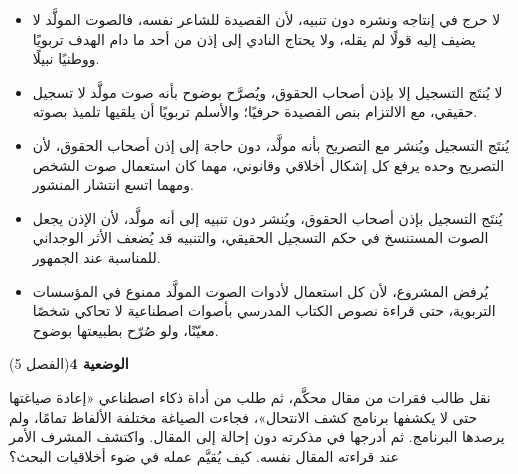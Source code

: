 \documentclass[11pt,a4paper]{article}
\begin{document}
\begin{itemize}[leftmargin=1.0cm, labelsep=6pt, itemsep=3pt, topsep=4pt, parsep=0pt]
  \item[\textbf{أ)}] لا حرج في إنتاجه ونشره دون تنبيه، لأن القصيدة للشاعر نفسه، فالصوت المولَّد لا يضيف إليه قولًا لم يقله، ولا يحتاج النادي إلى إذن من أحد ما دام الهدف تربويًا ووطنيًا نبيلًا.
  \item[\textbf{ب)}] لا يُنتَج التسجيل إلا بإذن أصحاب الحقوق، ويُصرَّح بوضوح بأنه صوت مولَّد لا تسجيل حقيقي، مع الالتزام بنص القصيدة حرفيًا؛ والأسلم تربويًا أن يلقيها تلميذ بصوته.
  \item[\textbf{ج)}] يُنتَج التسجيل ويُنشر مع التصريح بأنه مولَّد، دون حاجة إلى إذن أصحاب الحقوق، لأن التصريح وحده يرفع كل إشكال أخلاقي وقانوني، مهما كان استعمال صوت الشخص ومهما اتسع انتشار المنشور.
  \item[\textbf{د)}] يُنتَج التسجيل بإذن أصحاب الحقوق، ويُنشر دون تنبيه إلى أنه مولَّد، لأن الإذن يجعل الصوت المستنسخ في حكم التسجيل الحقيقي، والتنبيه قد يُضعف الأثر الوجداني للمناسبة عند الجمهور.
  \item[\textbf{هـ)}] يُرفض المشروع، لأن كل استعمال لأدوات الصوت المولَّد ممنوع في المؤسسات التربوية، حتى قراءة نصوص الكتاب المدرسي بأصوات اصطناعية لا تحاكي شخصًا معيّنًا، ولو صُرّح بطبيعتها بوضوح.
\end{itemize}
\par\vspace{6pt}
\noindent
{\large\khatt\textbf{الوضعية 4}}\hfill{\small(الفصل 5)}\par\nopagebreak\vspace{3pt}
\setlength{\fboxsep}{7pt}\colorbox{gray!10}{\parbox{\dimexpr\linewidth-14pt}{نقل طالب فقرات من مقال محكَّم، ثم طلب من أداة ذكاء اصطناعي «إعادة صياغتها حتى لا يكشفها برنامج كشف الانتحال»، فجاءت الصياغة مختلفة الألفاظ تمامًا، ولم يرصدها البرنامج. ثم أدرجها في مذكرته دون إحالة إلى المقال. واكتشف المشرف الأمر عند قراءته المقال نفسه. كيف يُقيَّم عمله في ضوء أخلاقيات البحث؟}}\par\nopagebreak
\end{document}
